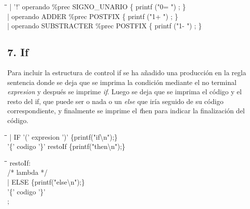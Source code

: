 \documentclass[11pt,spanish]{article}
\begin{document}
        \begin{tabbing}
            \hspace*{1cm}\=\hspace*{1cm}\= \hspace*{8cm}\=\kill
            \>| '!' operando \%prec SIGNO\_UNARIO\> \>  \{ printf ("0= ") ; \}\\
            \>| operando ADDER \%prec POSTFIX\> \>  \{ printf ("1+ ") ; \}\\
            \>| operando SUBSTRACTER \%prec POSTFIX\> \> \{ printf ("1- ") ; \}
        \end{tabbing}
        \subsection*{7. If}
        Para incluir la estructura de control if se ha añadido una producción en la regla {\ttfamily sentencia} donde se deja que se imprima la condición mediante el no terminal \textit {expresion} y después se imprime \textit {if}. Luego se deja que se imprima el código y el resto del if, que puede ser o nada o un \textit {else} que iría seguido de su código correspondiente, y finalmente se imprime el {\textit then} para indicar la finalización del código.
        \begin{tabbing}
            \hspace*{1cm}\=\hspace*{1cm}\= \hspace*{8cm}\=\kill
            \>| IF '(' expresion ')'\>\> \{printf("if\textbackslash n");\}\\
            \>\>'\{' codigo '\}' restoIf\> \{printf("then\textbackslash n");\}\\
        \end{tabbing}
        \begin{tabbing}
            \hspace*{1cm}\=\hspace*{1cm}\= \hspace*{8cm}\=\kill
            restoIf:\\
            \>/* lambda */ \\
            \>| ELSE\>\> \{printf("else\textbackslash n");\}\\
            \>'\{' codigo '\}'\\
            ;
		\end{tabbing}
\end{document}

